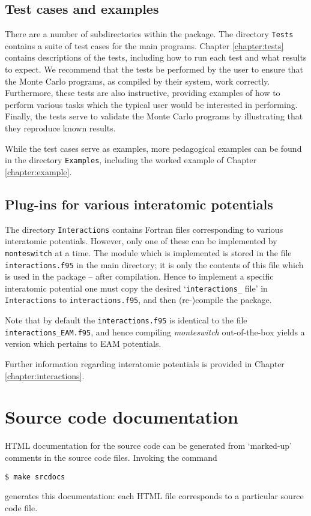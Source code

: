 \documentclass{report}
\begin{document}
\subsection{Test cases and examples}
There are a number of subdirectories within the package. The directory \texttt{Tests} contains a suite of test cases for the main programs. 
Chapter \ref{chapter:tests} contains descriptions of the tests, including how to run each test and what results 
to expect. We recommend that the tests be performed by the user to ensure that the Monte Carlo programs, as compiled by their system, work
correctly. Furthermore, these tests are also instructive, providing examples of how to perform various tasks which the typical user would be 
interested in performing. Finally, the tests serve to validate the Monte Carlo programs by illustrating that they reproduce known results.

While the test cases serve as examples, more pedagogical examples can be found in the directory \texttt{Examples}, including the worked example
of Chapter \ref{chapter:example}.

\subsection{Plug-ins for various interatomic potentials}
The directory \texttt{Interactions} contains Fortran files corresponding to various interatomic potentials. However, only one of these can be implemented 
by \texttt{monteswitch} at a time. The module which is implemented is stored in the file \texttt{interactions.f95} in the main directory; it is only the 
contents of this file which is used in the package -- after compilation. Hence to implement a specific interatomic potential one must copy
the desired `\texttt{interactions\_} file' in \texttt{Interactions} to \texttt{interactions.f95}, and then (re-)compile the package.

Note that by default the \texttt{interactions.f95} is identical to the file \texttt{interactions\_EAM.f95}, and hence compiling \emph{monteswitch}
out-of-the-box yields a version which pertains to EAM potentials.

Further information regarding interatomic potentials is provided in Chapter \ref{chapter:interactions}.

\section{Source code documentation}
HTML documentation for the source code can be generated from `marked-up' comments in the source code files. Invoking the command 
\begin{verbatim}
$ make srcdocs
\end{verbatim}
generates this documentation: each HTML file corresponds to a particular source code file.
\end{document}
